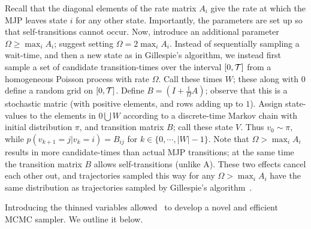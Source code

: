 Recall that the diagonal elements of the rate matrix $A_i$ give the 
rate at which the MJP leaves state $i$ for any other state. Importantly,
the parameters are set up so that self-transitions cannot occur. 
Now, introduce an additional parameter $\Omega \ge \max_i A_i$;
\cite{RaoTeh13} suggest setting $\Omega = 2 \max_i A_i$. 
Instead of sequentially sampling a wait-time, and then a new state as
in Gillespie's algorithm, we instead first sample a set of candidate
transition-times over the interval $[0,{\mathcal T}]$ from a homogeneous Poisson process 
with rate $\Omega$. Call these times $W$; these along with $0$ define a
random grid on $[0,{\mathcal T}]$.
Define $B = \left(I +\frac{1}{\Omega}A\right)$; observe that this is a
stochastic matric (with positive elements, and rows adding up to $1$).
Assign state-values to the elements in $0 \bigcup W$ according to a discrete-time 
Markov chain with initial distribution $\pi$, and transition matrix $B$;
call these state $V$. Thus $v_0 \sim \pi$, while $p(v_{k+1}=j|v_k=i) = B_{ij}$
for $k \in \{0,\cdots,|W|-1\}$.
Note that $\Omega > \max_i A_i$ results in more
candidate-times than actual MJP transitions; at the same time the transition
matrix $B$ allows self-transitions (unlike A). These two effects cancel
each other out, and trajectories sampled this way for any $\Omega > \max_i A_i$
have the same distribution as trajectories
sampled by Gillespie's algorithm~\cite{Jen1953,RaoTeh13}.

Introducing the thinned variables allowed~\cite{RaoTeh13} to develop
a novel and efficient MCMC sampler. We outline it below.


